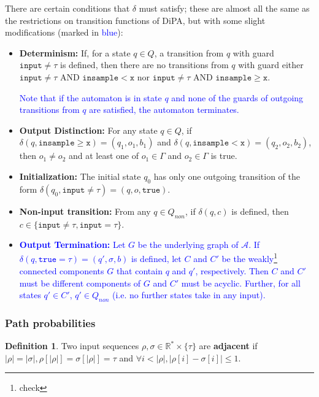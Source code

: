 \documentclass[12pt]{article}
\newcommand{\RR}{\mathbb{R}}
\newcommand{\gguard}{\texttt{insample}\geq \texttt{x}}
\newcommand{\lguard}{\texttt{insample} < \texttt{x}}
\newcommand{\itgguard}{\texttt{input}\neq\tau \text{ AND } \texttt{insample} \geq \texttt{x}}
\newcommand{\itlguard}{\texttt{input}\neq\tau \text{ AND }\texttt{insample} < \texttt{x}}
\theoremstyle{definition}
\newtheorem{defn}[thm]{Definition}
\begin{document}
There are certain conditions that $\delta$ must satisfy; these are almost all the same as the restrictions on transition functions of DiPA, but with some slight modifications (marked in \textcolor{blue}{blue}):
\begin{itemize}
	\item \textbf{Determinism:} 
	If, for a state $q\in Q$, a transition from $q$ with guard $\texttt{input}\neq \tau$ is defined, then there are no transitions from $q$ with guard either $\itlguard$ nor $\itgguard$.

	\textcolor{blue}{Note that if the automaton is in state $q$ and none of the guards of outgoing transitions from $q$ are satisfied, the automaton terminates.}
	
	\item \textbf{Output Distinction:} For any state $q\in Q$, if $\delta(q, \gguard) = (q_1, o_1, b_1)$ and $\delta(q, \lguard) = (q_2, o_2, b_2)$, then $o_1\neq o_2$ and at least one of $o_1\in \Gamma$ and $o_2\in \Gamma$ is true.

	\item \textbf{Initialization:} The initial state $q_0$ has only one outgoing transition of the form $\delta(q_0, \texttt{input}\neq\tau) = (q, o, \texttt{true})$.

	\item \textbf{Non-input transition:} From any $q\in Q_{non}$, if $\delta(q, c)$ is defined, then $c\in \{\texttt{input}\neq \tau, \texttt{input} = \tau\}$.

	\item \textcolor{blue}{\textbf{Output Termination:} Let $G$ be the underlying graph of $\mathcal{A}$. If $\delta(q, \texttt{true} = \tau) = (q', \sigma, b)$ is defined, let $C$ and $C'$ be the weakly\footnote{check} connected components $G$ that contain $q$ and $q'$, respectively. Then $C$ and $C'$ must be different components of $G$ and $C'$ must be acyclic. Further, for all states $q'\in C'$, $q'\in Q_{non}$ (i.e. no further states take in any input).} 
\end{itemize}

\subsubsection{Path probabilities}

\begin{defn}
	Two input sequences $\rho, \sigma\in \RR^*\times \{\tau\}$ are \textbf{adjacent} if $|\rho| = |\sigma|, \rho[|\rho|] = \sigma[|\rho|] = \tau$ and $\forall i < |\rho|, |\rho[i]-\sigma[i]| \leq 1$. 
\end{defn}
\end{document}
